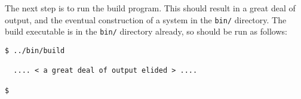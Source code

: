 The next step is to run the \textsf{build} program.  This should
result in a great deal of output, and the eventual construction of a
\HOL{} system in the \texttt{bin/} directory.  The \textsf{build}
executable is in the \texttt{bin/} directory already, so should be run
as follows:

\begin{session}
\begin{verbatim}
$ ../bin/build

  .... < a great deal of output elided > ....

$
\end{verbatim}
\end{session}



